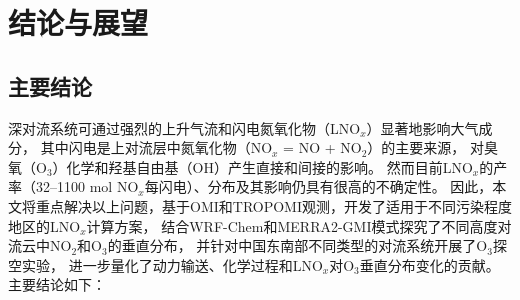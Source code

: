 
\chapter{结论与展望}

\section{主要结论}

深对流系统可通过强烈的上升气流和闪电氮氧化物（LNO$_x$）显著地影响大气成分，
其中闪电是上对流层中氮氧化物（NO$_x$ = NO + NO$_2$）的主要来源，
对臭氧（O$_3$）化学和羟基自由基（OH）产生直接和间接的影响。
然而目前LNO$_x$的产率（32--1100 mol NO$_x$每闪电）、分布及其影响仍具有很高的不确定性。
因此，本文将重点解决以上问题，基于OMI和TROPOMI观测，开发了适用于不同污染程度地区的LNO$_x$计算方案，
结合WRF-Chem和MERRA2-GMI模式探究了不同高度对流云中NO$_2$和O$_3$的垂直分布，
并针对中国东南部不同类型的对流系统开展了O$_3$探空实验，
进一步量化了动力输送、化学过程和LNO$_x$对O$_3$垂直分布变化的贡献。
主要结论如下：

